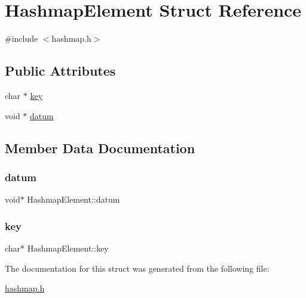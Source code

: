\hypertarget{structHashmapElement}{}\section{Hashmap\+Element Struct Reference}
\label{structHashmapElement}


{\ttfamily \#include $<$hashmap.\+h$>$}

\subsection*{Public Attributes}
\begin{DoxyCompactItemize}
\item 
char $\ast$ \hyperlink{structHashmapElement_a14c854540e557b6e3f78e5b2229fb694}{key}
\item 
void $\ast$ \hyperlink{structHashmapElement_a0aa5a85cb3645771dad624aa385db83e}{datum}
\end{DoxyCompactItemize}


\subsection{Member Data Documentation}
\mbox{\label{structHashmapElement_a0aa5a85cb3645771dad624aa385db83e}} 
\subsubsection{\texorpdfstring{datum}{datum}}
{\footnotesize\ttfamily void$\ast$ Hashmap\+Element\+::datum}

\mbox{\label{structHashmapElement_a14c854540e557b6e3f78e5b2229fb694}} 
\subsubsection{\texorpdfstring{key}{key}}
{\footnotesize\ttfamily char$\ast$ Hashmap\+Element\+::key}



The documentation for this struct was generated from the following file\+:\begin{DoxyCompactItemize}
\item 
\hyperlink{hashmap_8h}{hashmap.\+h}\end{DoxyCompactItemize}

